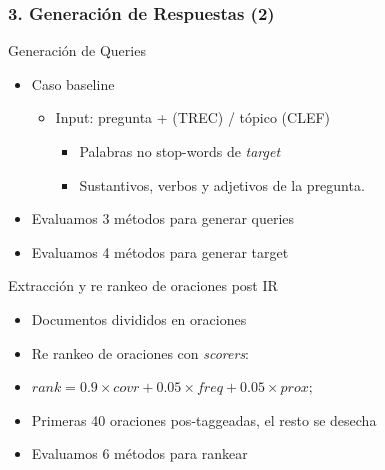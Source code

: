 \begin{frame}
\frametitle{3. Generación de Respuestas (2)}
  \begin{block}{Generación de Queries}
  \begin{itemize}
      \item Caso baseline
      \begin{itemize}
        \item Input: pregunta + (TREC) / tópico (CLEF)
        \begin{itemize}
              \item Palabras no stop-words de \textit{target} 
              \item Sustantivos, verbos y adjetivos de la pregunta.
        \end{itemize}
      \end{itemize}
      \item Evaluamos 3 métodos para generar queries
      \item Evaluamos 4 métodos para generar target
    \end{itemize}
  \end{block}

    \begin{exampleblock}{Extracción y re rankeo de oraciones post IR}
    \begin{itemize}
      \item Documentos divididos en oraciones
      \item Re rankeo de oraciones con \textit{scorers}:
      \item $rank = 0.9\times covr + 0.05\times freq + 0.05\times prox;$ %
      \item Primeras 40 oraciones pos-taggeadas, el resto se desecha
      \item Evaluamos 6 métodos para rankear
    \end{itemize}
  \end{exampleblock}
\end{frame}



